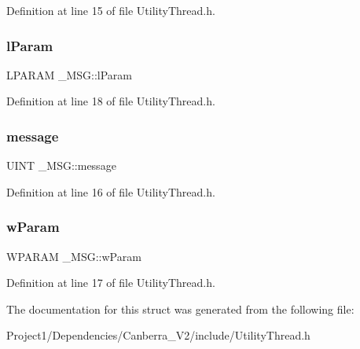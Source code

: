 Definition at line 15 of file Utility\+Thread.\+h.

\mbox{\label{struct___m_s_g_a9537c524889d8c2e93f750f97e4f985b}} 
\subsubsection{\texorpdfstring{l\+Param}{lParam}}
{\footnotesize\ttfamily L\+P\+A\+R\+AM \+\_\+\+M\+S\+G\+::l\+Param}



Definition at line 18 of file Utility\+Thread.\+h.

\mbox{\label{struct___m_s_g_ab90fa5e1cafdc0a1dc6bec0a731bf10f}} 
\subsubsection{\texorpdfstring{message}{message}}
{\footnotesize\ttfamily U\+I\+NT \+\_\+\+M\+S\+G\+::message}



Definition at line 16 of file Utility\+Thread.\+h.

\mbox{\label{struct___m_s_g_a167c251f555f1752dad816e567ec8c78}} 
\subsubsection{\texorpdfstring{w\+Param}{wParam}}
{\footnotesize\ttfamily W\+P\+A\+R\+AM \+\_\+\+M\+S\+G\+::w\+Param}



Definition at line 17 of file Utility\+Thread.\+h.



The documentation for this struct was generated from the following file\+:\begin{DoxyCompactItemize}
\item 
Project1/\+Dependencies/\+Canberra\+\_\+\+V2/include/Utility\+Thread.\+h\end{DoxyCompactItemize}
